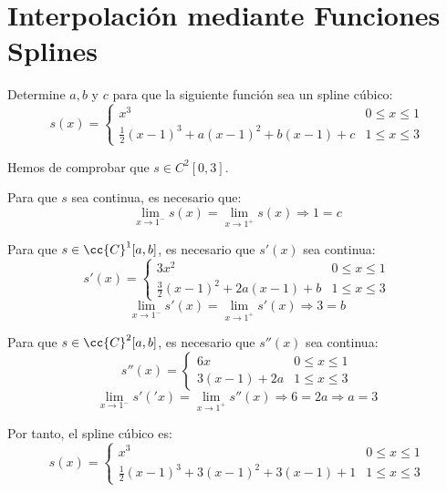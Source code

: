 \section{Interpolación mediante Funciones Splines}\label{sec:Rel3.2}

\begin{ejercicio} Determine $a, b$ y $c$ para que la siguiente función sea un spline cúbico:
\begin{equation*}
    s(x)=\left\{\begin{array}{lc}
        x^3 & 0\leq x \leq 1 \\
        \frac{1}{2}(x-1)^3 +a(x-1)^2 + b(x-1) + c& 1\leq x \leq 3 
    \end{array}\right.
\end{equation*}

Hemos de comprobar que $s\in {C}^{2}[0,3]$.

Para que $s$ sea continua, es necesario que:
\begin{equation*}
    \lim_{x\to1^-}s(x) = \lim_{x\to1^+}s(x) \Longrightarrow 1 = c
\end{equation*}

Para que $s\in \cc{C}^1[a,b]$, es necesario que $s'(x)$ sea continua:
\begin{equation*}
    s'(x)=\left\{\begin{array}{lc}
        3x^2 & 0\leq x \leq 1 \\
        \frac{3}{2}(x-1)^2 +2a(x-1) + b& 1\leq x \leq 3 
    \end{array}\right.
\end{equation*}
\begin{equation*}
    \lim_{x\to1^-}s'(x) = \lim_{x\to1^+}s'(x) \Longrightarrow 3 = b
\end{equation*}

Para que $s\in \cc{C}^2[a,b]$, es necesario que $s''(x)$ sea continua:
\begin{equation*}
    s''(x)=\left\{\begin{array}{lc}
        6x & 0\leq x \leq 1 \\
        3(x-1) +2a& 1\leq x \leq 3 
    \end{array}\right.
\end{equation*}
\begin{equation*}
    \lim_{x\to1^-}s'('x) = \lim_{x\to1^+}s''(x) \Longrightarrow 6=2a \Longrightarrow a=3
\end{equation*}

Por tanto, el spline cúbico es:
\begin{equation*}
    s(x)=\left\{\begin{array}{lc}
        x^3 & 0\leq x \leq 1 \\
        \frac{1}{2}(x-1)^3 +3(x-1)^2 + 3(x-1) + 1& 1\leq x \leq 3 
    \end{array}\right.
\end{equation*}

\end{ejercicio}


